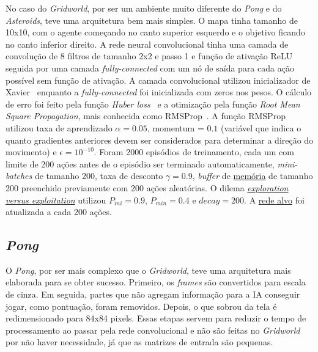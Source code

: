 No caso do \textit{Gridworld}, por ser um ambiente muito diferente do \textit{Pong} e do \textit{Asteroids}, teve uma arquitetura bem mais simples.
O mapa tinha tamanho de 10x10, com o agente começando no canto superior esquerdo e o objetivo ficando no canto inferior direito.
A rede neural convolucional tinha uma camada de convolução de 8 filtros de tamanho 2x2 e passo 1 e função de ativação ReLU seguida por uma camada \textit{fully-connected} com um nó de saída para cada ação possível sem função de ativação.
A camada convolucional utilizou inicializador de Xavier~\cite{pmlr-v9-glorot10a} enquanto a \textit{fully-connected} foi inicializada com zeros nos pesos.
O cálculo de erro foi feito pela função \textit{Huber loss}~\cite{huber_loss} e a otimização pela função \textit{Root Mean Square Propagation}, mais conhecida como RMSProp~\cite{rmsprop}.
A função RMSProp utilizou taxa de aprendizado $\alpha = 0.05$, momentum = $0.1$ (variável que indica o quanto gradientes anteriores devem ser considerados para determinar a direção do movimento) e $\epsilon = 10^{-10}$.
Foram 2000 episódios de treinamento, cada um com limite de 200 ações antes de o episódio ser terminado automaticamente, \textit{mini-batches} de tamanho 200, taxa de desconto $\gamma = 0.9$, \textit{buffer} de \hyperref[sec:er]{memória} de tamanho 200 preenchido previamente com 200 ações aleatórias.
O dilema \hyperref[eq:exp_exp_prob]{\textit{exploration versus exploitation}} utilizou $P_{ini} = 0.9$, $P_{min} = 0.4$ e $decay = 200$.
A \hyperref[sec:ft]{rede alvo} foi atualizada a cada 200 ações.

\subsection{\textit{Pong}}
\label{sec:arq_pong}

O \textit{Pong}, por ser mais complexo que o \textit{Gridworld}, teve uma arquitetura mais elaborada para se obter sucesso.
Primeiro, os \textit{frames} são convertidos para escala de cinza.
Em seguida, partes que não agregam informação para a IA conseguir jogar, como pontuação, foram removidos.
Depois, o que sobrou da tela é redimensionado para 84x84 pixels.
Essas etapas servem para reduzir o tempo de processamento ao passar pela rede convolucional e não são feitas no \textit{Gridworld} por não haver necessidade, já que as matrizes de entrada são pequenas.

